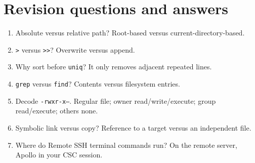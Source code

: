 \documentclass[11pt,a4paper]{article}
\begin{document}
\section{Revision questions and answers}
\begin{enumerate}
\item Absolute versus relative path? Root-based versus current-directory-based.
\item \texttt{>} versus \texttt{>>}? Overwrite versus append.
\item Why sort before \texttt{uniq}? It only removes adjacent repeated lines.
\item \texttt{grep} versus \texttt{find}? Contents versus filesystem entries.
\item Decode \texttt{-rwxr-x---}. Regular file; owner read/write/execute; group read/execute; others none.
\item Symbolic link versus copy? Reference to a target versus an independent file.
\item Where do Remote SSH terminal commands run? On the remote server, Apollo in your CSC session.
\end{enumerate}
\end{document}
